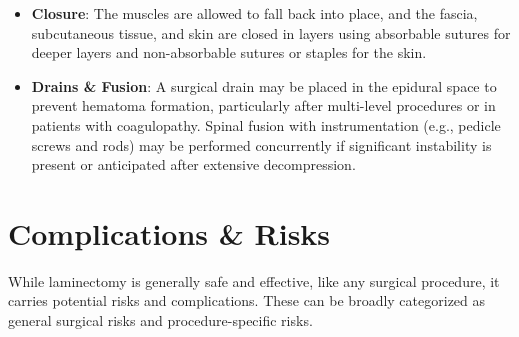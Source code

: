 \begin{itemize}
  \item \textbf{Closure}: The muscles are allowed to fall back into place, and the fascia, subcutaneous tissue, and skin are closed in layers using absorbable sutures for deeper layers and non-absorbable sutures or staples for the skin.
  \item \textbf{Drains \& Fusion}: A surgical drain may be placed in the epidural space to prevent hematoma formation, particularly after multi-level procedures or in patients with coagulopathy. Spinal fusion with instrumentation (e.g., pedicle screws and rods) may be performed concurrently if significant instability is present or anticipated after extensive decompression.
\end{itemize}

\section*{Complications \& Risks}
While laminectomy is generally safe and effective, like any surgical procedure, it carries potential risks and complications. These can be broadly categorized as general surgical risks and procedure-specific risks.

